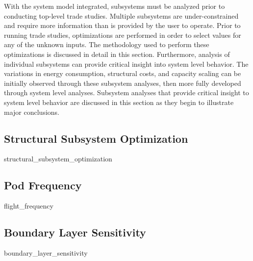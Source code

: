 With the system model integrated, subsystems must be analyzed prior to conducting top-level trade studies.
Multiple subsystems are under-constrained and require more information than is provided by the user to operate.
Prior to running trade studies, optimizations are performed 
in order to select values for any of the unknown inputs.
The methodology used to perform these optimizations is discussed in detail in this section.
Furthermore, analysis of individual subsystems can provide critical insight into system level behavior.
The variations in energy consumption, structural costs, and capacity scaling
can be initially observed through these subsystem analyses,
then more fully developed through system level analyses.
Subsystem analyses that provide critical insight to system level behavior are
discussed in this section as they begin to illustrate major conclusions.
\subsection{Structural Subsystem Optimization}
	{structural_subsystem_optimization}
\subsection{Pod Frequency}
	{flight_frequency}
\subsection{Boundary Layer Sensitivity}
	{boundary_layer_sensitivity}
